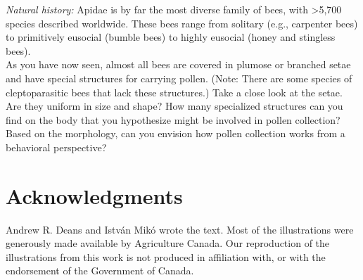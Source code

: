 \documentclass[letterpaper, 11pt]{article}
\begin{document}
\noindent{}\textit{Natural history:} Apidae is by far the most diverse family of bees, with \textgreater5,700 species described worldwide. These bees range from solitary (e.g., carpenter bees) to primitively eusocial (bumble bees) to highly eusocial (honey and stingless bees). \\

\noindent{}As you have now seen, almost all bees are covered in plumose or branched setae and have special structures for carrying pollen. (Note: There are some species of cleptoparasitic bees that lack these structures.) Take a close look at the setae. Are they uniform in size and shape? How many specialized structures can you find on the body that you hypothesize might be involved in pollen collection? Based on the morphology, can you envision how pollen collection works from a behavioral perspective?

\FloatBarrier

\section*{Acknowledgments}
Andrew R. Deans and Istv\'an Mik\'o wrote the text. Most of the illustrations were generously made available by Agriculture Canada. Our reproduction of the illustrations from this work is not produced in affiliation with, or with the endorsement of the Government of Canada.

\FloatBarrier


\end{document}
